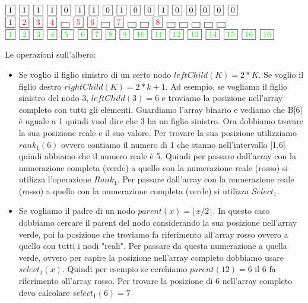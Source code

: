 \documentclass[14pt]{extreport}
\begin{document}
  \newcommand{\sep}{\hspace*{.5em}}
  \noindent
  $\fbox{1} \sep \fbox{1} \sep \fbox{1} \sep \fbox{1} \sep \fbox{0} \sep \fbox{1} \sep \fbox{1} \sep \fbox{0} \sep \fbox{1} \sep \fbox{0} \sep \fbox{0} \sep \fbox{1} \sep \fbox{0} \sep \fbox{0} \sep \fbox{0} \sep \fbox{0} \sep \fbox{0}$
  \newline
  \newcommand{\sep}{\hspace*{.5em}}
  \noindent
  $\fbox{\color{red} 1} \sep \fbox{\color{red} 2} \sep \fbox{\color{red} 3} \sep \fbox{\color{red} 4} \sep \fbox{ } \sep \fbox{\color{red} 5} \sep \fbox{\color{red} 6} \sep \fbox{ } \sep \fbox{\color{red} 7} \sep \fbox{ } \sep \fbox{ } \sep \fbox{\color{red} 8} \sep \fbox{ } \sep \fbox{ } \sep \fbox{ } \sep \fbox{ } \sep \fbox{ }$
\newline
  \newcommand{\sep}{\hspace*{.5em}}
  \noindent
  $\fbox{\color{green} 1} \sep \fbox{\color{green} 2} \sep \fbox{\color{green} 3} \sep \fbox{\color{green} 4} \sep \fbox{\color{green}5 } \sep \fbox{\color{green} 6} \sep \fbox{\color{green} 7} \sep \fbox{\color{green} 8} \sep \fbox{\color{green} 9} \sep \fbox{\color{green} 10} \sep \fbox{\color{green} 11} \sep \fbox{\color{green} 12} \sep \fbox{\color{green} 13} \sep \fbox{\color{green} 14} \sep \fbox{\color{green} 15} \sep \fbox{\color{green} 16} \sep \fbox{\color{green} 16}$

Le operazioni sull'albero:

\begin{itemize}
    \item Se voglio il figlio sinistro di un certo nodo $leftChild(K) = 2*K$. Se voglio il figlio destro $rightChild(K) = 2*k + 1$. 
    Ad esempio, se vogliamo il figlio sinistro del nodo 3, $leftChild(3) = 6$ e troviamo la posizione nell'array completo con tutti gli elementi. Guardiamo l'array binario e vediamo che B[6] è uguale a 1 quindi vuol dire che 3 ha un figlio sinistro. Ora dobbiamo trovare la sua posizione reale e il suo valore. Per trovare la sua posizione utilizziamo $rank_1(6)$ ovvero contiamo il numero di 1 che stanno nell'intervallo [1,6] quindi abbiamo che il numero reale è 5.
    Quindi per passare dall'array con la numerazione completa (verde) a quello con la numerazione reale (rosso) si utilizza l'operazione $Rank_1$. Per passare dall'array con la numerazione reale (rosso) a quello con la numerazione completa (verde) si utilizza $Select_1$.
    \item Se vogliamo il padre di un nodo $parent(x) = \lfloor{x/2}\rfloor{}$. In questo caso dobbiamo cercare il parent del nodo considerando la sua posizione nell'array verde, poi la posizione che troviamo fa riferimento all'array rosso ovvero a quello con tutti i nodi "reali".
    Per passare da questa numerazione a quella verde, ovvero per capire la posizione nell'array completo dobbiamo usare $select_1(x)$. Quindi per esempio se cerchiamo $parent(12) = 6$ il 6 fa riferimento all'array rosso. Per trovare la posizione di 6 nell'array completo devo calcolare $select_1(6) = 7$
\end{itemize}
\end{document}
